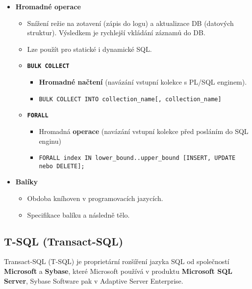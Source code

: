 \begin{itemize}
\item\textbf{Hromadné operace}
\begin{itemize}
\item Snížení režie na zotavení (zápis do logu) a aktualizace DB (datových struktur). Výsledkem je rychlejší vkládání záznamů do DB.
\item Lze použít pro statické i dynamické SQL.
\item \textbf{\texttt{BULK COLLECT}}
\begin{itemize}
\item \textbf{Hromadné načtení} (navázání vstupní kolekce s PL/SQL enginem).
\item \texttt{BULK COLLECT INTO collection\_name[, collection\_name]}
\end{itemize}

\item \textbf{\texttt{FORALL}}
\begin{itemize}
\item Hromadná \textbf{operace} (navázání vstupní kolekce před posláním do SQL enginu)
\item \texttt{FORALL index IN lower\_bound..upper\_bound [INSERT, UPDATE nebo DELETE];}
\end{itemize}
\end{itemize}



\item\textbf{Balíky}
\begin{itemize}
\item Obdoba kníhoven v programovacích jazycích.
\item Specifikace balíku a následně tělo. 
\end{itemize}


\end{itemize}






\subsection{T-SQL (Transact-SQL)}
Transact-SQL (T-SQL) je proprietární rozšíření jazyka SQL od společností \textbf{Microsoft} a \textbf{Sybase}, které Microsoft používá v produktu \textbf{Microsoft SQL Server}, Sybase Software pak v Adaptive Server Enterprise.

